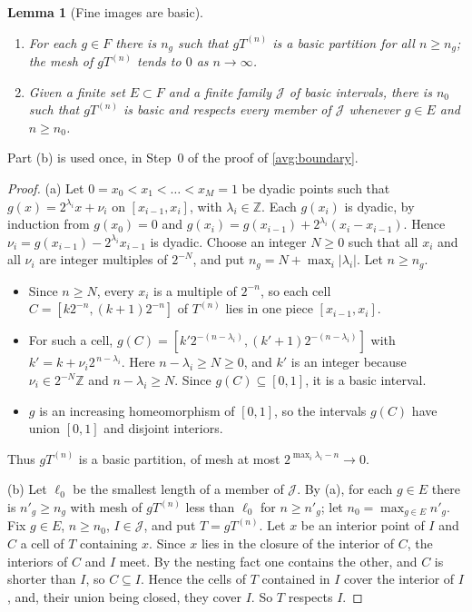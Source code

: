 \documentclass[11pt]{article}
\newcommand{\Z}{\mathbb Z}
\newtheorem{lemma}[theorem]{Lemma}
\theoremstyle{definition}
\numberwithin{equation}{section}
\begin{document}
\begin{lemma}[Fine images are basic]\label{dyad:eventual}
\begin{enumerate}[label=(\alph*)]
\item For each \(g\in F\) there is \(n_g\) such that \(gT^{(n)}\) is a basic
partition for all \(n\ge n_g\); the mesh of \(gT^{(n)}\) tends to \(0\) as
\(n\to\infty\).
\item Given a finite set \(E\subset F\) and a finite family \(\mathcal J\) of
basic intervals, there is \(n_0\) such that \(gT^{(n)}\) is basic and respects
every member of \(\mathcal J\) whenever \(g\in E\) and \(n\ge n_0\).
\end{enumerate}
\end{lemma}
Part (b) is used once, in Step~0 of the proof of \cref{avg:boundary}.

\begin{proof}
(a) Let \(0=x_0<x_1<\dots<x_M=1\) be dyadic points such that
\(g(x)=2^{\lambda_i}x+\nu_i\) on \([x_{i-1},x_i]\), with \(\lambda_i\in\Z\).
Each \(g(x_i)\) is dyadic, by induction from \(g(x_0)=0\) and
\(g(x_i)=g(x_{i-1})+2^{\lambda_i}(x_i-x_{i-1})\). Hence
\(\nu_i=g(x_{i-1})-2^{\lambda_i}x_{i-1}\) is dyadic. Choose an integer
\(N\ge0\) such that all \(x_i\) and all \(\nu_i\) are integer multiples of
\(2^{-N}\), and put \(n_g=N+\max_i|\lambda_i|\). Let \(n\ge n_g\).
\begin{itemize}
\item Since \(n\ge N\), every \(x_i\) is a multiple of \(2^{-n}\), so each
cell \(C=[k2^{-n},(k+1)2^{-n}]\) of \(T^{(n)}\) lies in one piece
\([x_{i-1},x_i]\).
\item For such a cell,
\(g(C)=[k'2^{-(n-\lambda_i)},(k'+1)2^{-(n-\lambda_i)}]\) with
\(k'=k+\nu_i2^{\,n-\lambda_i}\). Here \(n-\lambda_i\ge N\ge0\), and \(k'\) is
an integer because \(\nu_i\in2^{-N}\Z\) and \(n-\lambda_i\ge N\). Since
\(g(C)\subseteq[0,1]\), it is a basic interval.
\item \(g\) is an increasing homeomorphism of \([0,1]\), so the intervals
\(g(C)\) have union \([0,1]\) and disjoint interiors.
\end{itemize}
Thus \(gT^{(n)}\) is a basic partition, of mesh at most
\(2^{\max_i\lambda_i-n}\to0\).

(b) Let \(\ell_0\) be the smallest length of a member of \(\mathcal J\). By
(a), for each \(g\in E\) there is \(n'_g\ge n_g\) with mesh of \(gT^{(n)}\)
less than \(\ell_0\) for \(n\ge n'_g\); let \(n_0=\max_{g\in E}n'_g\). Fix
\(g\in E\), \(n\ge n_0\), \(I\in\mathcal J\), and put \(T=gT^{(n)}\). Let
\(x\) be an interior point of \(I\) and \(C\) a cell of \(T\) containing
\(x\). Since \(x\) lies in the closure of the interior of \(C\), the interiors
of \(C\) and \(I\) meet. By the nesting fact one contains the other, and \(C\)
is shorter than \(I\), so \(C\subseteq I\). Hence the cells of \(T\) contained
in \(I\) cover the interior of \(I\), and, their union being closed, they
cover \(I\). So \(T\) respects \(I\).
\end{proof}
\end{document}
